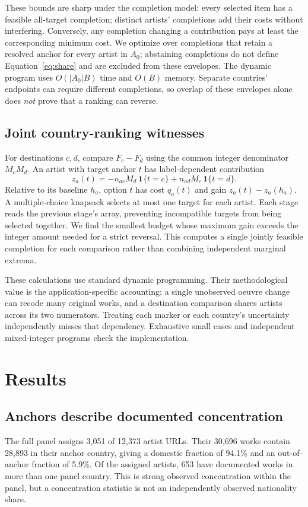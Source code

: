 These bounds are sharp under the completion model: every selected item has a feasible all-target completion; distinct artists' completions add their costs without interfering. Conversely, any completion changing a contribution pays at least the corresponding minimum cost. We optimize over completions that retain a resolved anchor for every artist in $A_0$; abstaining completions do not define Equation~\ref{eq:share} and are excluded from these envelopes. The dynamic program uses $O(|A_0|B)$ time and $O(B)$ memory. Separate countries' endpoints can require different completions, so overlap of these envelopes alone does \emph{not} prove that a ranking can reverse.

\subsection{Joint country-ranking witnesses}
For destinations $c,d$, compare $F_c-F_d$ using the common integer denominator $M_cM_d$. An artist with target anchor $t$ has label-dependent contribution
\begin{equation}
 z_a(t)=-n_{ac}M_d\,\mathbf{1}\{t=c\}
       +n_{ad}M_c\,\mathbf{1}\{t=d\}.
\end{equation}
Relative to its baseline $h_a$, option $t$ has cost $q_a(t)$ and gain $z_a(t)-z_a(h_a)$. A multiple-choice knapsack selects at most one target for each artist. Each stage reads the previous stage's array, preventing incompatible targets from being selected together. We find the smallest budget whose maximum gain exceeds the integer amount needed for a strict reversal. This computes a single jointly feasible completion for each comparison rather than combining independent marginal extrema.

These calculations use standard dynamic programming. Their methodological value is the application-specific accounting: a single unobserved oeuvre change can recode many original works, and a destination comparison shares artists across its two numerators. Treating each marker or each country's uncertainty independently misses that dependency. Exhaustive small cases and independent mixed-integer programs check the implementation.

\section{Results}
\subsection{Anchors describe documented concentration}
The full panel assigns 3,051 of 12,373 artist URLs. Their 30,696 works contain 28,893 in their anchor country, giving a domestic fraction of 94.1\% and an out-of-anchor fraction of 5.9\%. Of the assigned artists, 653 have documented works in more than one panel country. This is strong observed concentration within the panel, but a concentration statistic is not an independently observed nationality share.

